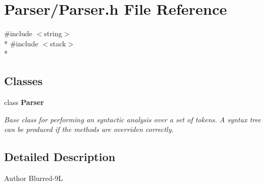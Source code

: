 \section{Parser/\-Parser.h File Reference}
\label{_parser_8h}
{\ttfamily \#include $<$string$>$}\\*
{\ttfamily \#include $<$stack$>$}\\*
\subsection*{Classes}
\begin{DoxyCompactItemize}
\item 
class {\bf Parser}
\begin{DoxyCompactList}\small\item\em Base class for performing an syntactic analysis over a set of tokens. A syntax tree can be produced if the methods are overriden correctly. \end{DoxyCompactList}\end{DoxyCompactItemize}


\subsection{Detailed Description}
\begin{DoxyAuthor}{Author}
Blurred-\/9\-L 
\end{DoxyAuthor}
